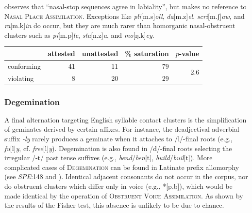 \citet[175]{Pierrehumbert1994} observes that ``nasal-stop sequences agree in labiality'', but makes no reference to \textsc{Nasal Place Assimilation}. Exceptions like \emph{pli}[m.s]\emph{oll}, \emph{da}[m.z]\emph{el}, \emph{scri}[m.ʃ]\emph{aw}, and \emph{ra}[m.k]\emph{in} do occur, but they are much rarer than homorganic nasal-obstruent clusters such as \emph{pi}[m.p]\emph{le}, \emph{sta}[n.z]\emph{a}, and \emph{mo}[ŋ.k]\emph{ey}.

\begin{example}
\begin{tabular}{l r r r r}
\toprule
           & attested & unattested & \% saturation & $p$-value                   \\
\midrule
conforming & 41       & 11         & 79          & \multirow{2}{*}{2.6\e{-05}} \\
violating  & 8        & 20         & 29                                    \\
\bottomrule
\end{tabular}
\end{example}

\subsubsection{Degemination} 
\label{deg}

A final alternation targeting English syllable contact clusters is the simplification of geminates derived by certain affixes. For instance, the deadjectival adverbial suffix \emph{-ly} rarely produces a geminate when it attaches to /l/-final roots (e.g., \emph{fu}[l]\emph{y}, cf. \emph{free}[l]\emph{y}). Degemination is also found in /d/-final roots selecting the irregular /-t/ past tense suffixes (e.g., \emph{bend}/\emph{ben}[t], \emph{build}/\emph{buil}[t]). More complicated cases of \textsc{Degemination} can be found in Latinate prefix allomorphy (see \emph{SPE}:148 and \citealt[102]{Borowsky1986}). Identical adjacent consonants do not occur in the corpus, nor do obstruent clusters which differ only in voice (e.g., *[p.b]), which would be made identical by the operation of \textsc{Obstruent Voice Assimilation}. As shown by the results of the Fisher test, this absence is unlikely to be due to chance.

